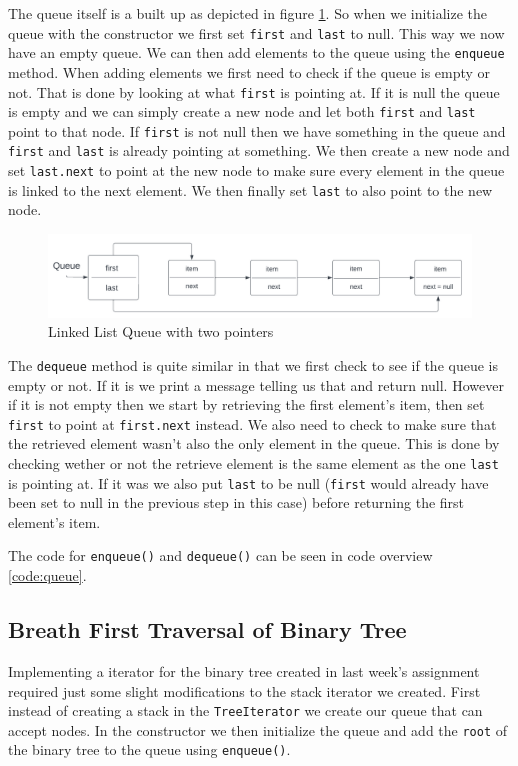 \documentclass[a4paper,11pt]{article}
\begin{document}
The queue itself is a built up as depicted in figure \ref{fig:queue}. So when we initialize the queue with the constructor we first set {\tt first} and {\tt last}
to null. This way we now have an empty queue. We can then add elements to the queue using the {\tt enqueue} method. When adding elements we first need to check if
the queue is empty or not. That is done by looking at what {\tt first} is pointing at. If it is null the queue is empty and we can simply create a new node and let
both {\tt first} and {\tt last} point to that node. If {\tt first} is not null then we have something in the queue and {\tt first} and {\tt last} is already pointing
at something. We then create a new node and set {\tt last.next} to point at the new node to make sure every element in the queue is linked to the next element. We
then finally set {\tt last} to also point to the new node.
\begin{figure}[h!]
    \centering
    \includegraphics[width=\textwidth]{queue.pdf}
    \caption{Linked List Queue with two pointers}
    \label{fig:queue}
\end{figure}

The {\tt dequeue} method is quite similar in that we first check to see if the queue is empty or not. If it is we print a message telling us that and return null.
However if it is not empty then we start by retrieving the first element's item, then set {\tt first} to point at {\tt first.next} instead. We also need to check to
make sure that the retrieved element wasn't also the only element in the queue. This is done by checking wether or not the retrieve element is the same element as
the one {\tt last} is pointing at. If it was we also put {\tt last} to be null ({\tt first} would already have been set to null in the previous step in this case)
before returning the first element's item.

The code for {\tt enqueue()} and {\tt dequeue()} can be seen in code overview \ref{code:queue}.

\subsection{Breath First Traversal of Binary Tree}
\label{met-breath}
Implementing a iterator for the binary tree created in last week's assignment required just some slight modifications to the stack iterator we created.
First instead of creating a stack in the {\tt TreeIterator} we create our queue that can accept nodes. In the constructor we then initialize the queue and
add the {\tt root} of the binary tree to the queue using {\tt enqueue()}.
\end{document}

